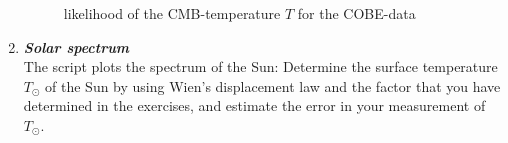 \documentclass[a4paper,12pt]{article}
\newcommand{\question}[1]{\textbf{\textit{#1}}}
\begin{document}
\begin{enumerate}
\begin{figure}[h]
\begin{center}
\caption{likelihood of the CMB-temperature $T$ for the COBE-data}
\end{center}
\end{figure}

\item \question{Solar spectrum}\\
The script  plots the spectrum of the Sun: Determine the surface temperature $T_\odot$ of the Sun by using Wien's displacement law and the factor that you have determined in the exercises, and estimate the error in your measurement of $T_\odot$.

\end{enumerate}
\end{document}
